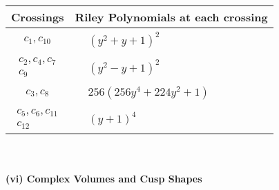 \documentclass[1p]{elsarticle_modified}
\theoremstyle{definition}
\begin{document}
\begin{tabular}{m{50pt}|m{274pt}}
Crossings & \hspace{64pt}Riley Polynomials at each crossing \\
\hline $$\begin{aligned}c_{1},c_{10}\end{aligned}$$&$\begin{aligned}
&(y^2+y+1)^2
\end{aligned}$\\
\hline $$\begin{aligned}c_{2},c_{4},c_{7}\\c_{9}\end{aligned}$$&$\begin{aligned}
&(y^2- y+1)^2
\end{aligned}$\\
\hline $$\begin{aligned}c_{3},c_{8}\end{aligned}$$&$\begin{aligned}
&256(256 y^4+224 y^2+1)
\end{aligned}$\\
\hline $$\begin{aligned}c_{5},c_{6},c_{11}\\c_{12}\end{aligned}$$&$\begin{aligned}
&(y+1)^4
\end{aligned}$\\
\hline
\end{tabular}\\~\\
\newpage\flushleft \textbf{(vi) Complex Volumes and Cusp Shapes}
\end{document}
